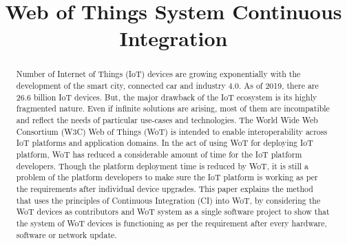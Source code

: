 \documentclass[conference]{IEEEtran}
\theoremstyle{definition}
\begin{document}
\title{Web of Things System Continuous Integration \\
}

\author{
  \and
  \and
}

\maketitle
 


\begin{abstract}

  Number of Internet of Things (IoT) devices are growing exponentially with the development of the smart city, connected car and industry 4.0.
  As of 2019, there are 26.6 billion IoT devices. 
  But, the major drawback of the IoT ecosystem is its highly fragmented nature. 
  Even if infinite solutions are arising, most of them are incompatible and reflect the needs of particular use-cases and technologies. 
  The World Wide Web Consortium (W3C) Web of Things (WoT) is intended to enable interoperability across IoT platforms and application domains. 
  In the act of using WoT for deploying IoT platform, WoT has reduced a considerable amount of time for the IoT platform developers. 
  Though the platform deployment time is reduced by WoT, it is still a problem of the platform developers to make sure the IoT platform is working as per the requirements after individual device upgrades.  
  This paper explains the method that uses the principles of Continuous Integration (CI) into WoT, by considering the WoT devices as contributors and WoT system as a single software project to show that the system of WoT devices is functioning as per the requirement after every hardware, software or network update.

\end{abstract}
\end{document}
